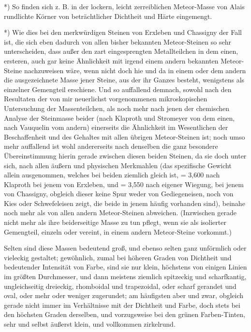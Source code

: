 \documentclass[a4paper, 11pt, oneside, german]{article}
\begin{document}
*) So finden sich z. B. in der lockern, leicht zerreiblichen Meteor-Masse von Alais rundlichte Körner von beträchtlicher Dichtheit und Härte eingemengt.

*) Wie dies bei den merkwürdigen Steinen von Erxleben und Chassigny der Fall ist, die sich eben dadurch von allen bisher bekannten Meteor-Steinen so sehr unterscheiden, dass außer den zart eingesprengten Metallteilchen in dem einen, ersteren, auch gar keine Ähnlichkeit mit irgend einem andern bekannten Meteor-Steine nachzuweisen wäre, wenn nicht doch hie und da in einem oder dem andern die ausgezeichnete Masse jener Steine, aus der ihr Ganzes besteht, wenigstens als einzelner Gemengteil erschiene. Und so auffallend demnach, sowohl nach den Resultaten der von mir neuerlichst vorgenommenen mikroskopischen Untersuchung der Massenteilchen, als noch mehr nach jenen der chemischen Analyse der Steinmasse beider (nach Klaproth und Stromeyer von dem einen, nach Vauquelin vom andern) einerseits die Ähnlichkeit im Wesentlichen der Beschaffenheit und des Gehaltes mit allen übrigen Meteor-Steinen ist; noch umso mehr auffallend ist wohl andererseits nach denselben die ganz besondere Übereinstimmung hierin gerade zwischen diesen beiden Steinen, da sie doch unter sich, nach allen äußern und physischen Merkmahlen (das spezifische Gewicht allein ausgenommen, welches bei beiden ziemlich gleich ist, = 3,600 nach Klaproth bei jenem von Erxleben, und = 3,550 nach eigener Wiegung, bei jenem von Chassigny, obgleich dieser keine Spur weder von Gediegeneisen, noch von Kies oder Schwefeleisen zeigt, die beide in jenem häufig vorhanden sind), beinahe noch mehr als von allen andern Meteor-Steinen abweichen. (Inzwischen gerade nicht mehr als ihre beiderseitige Masse zu tun pflegt, wenn sie als isolierter Gemengteil, einzeln oder vereint, in einem andern Meteor-Steine vorkommt.)

Selten sind diese Massen bedeutend groß, und ebenso selten ganz unförmlich oder vieleckig gestaltet; gewöhnlich, zumal bei höheren Graden von Dichtheit und bedeutender Intensität von Farbe, sind sie nur klein, höchstens von einigen Linien im größten Durchmesser, und dann meistens ziemlich spitzeckig und scharfkantig, ungleichseitig dreieckig, rhomboidal und trapezoidal, oder scharf gerandet und oval, oder mehr oder weniger zugerundet; am häufigsten aber und zwar, obgleich gerade nicht immer im Verhältnisse mit der Dichtheit und Farbe, doch stets bei den höchsten Graden derselben, und vorzugsweise bei den grünen Farben-Tinten, sehr und selbst äußerst klein, und vollkommen zirkelrund.
\end{document}
